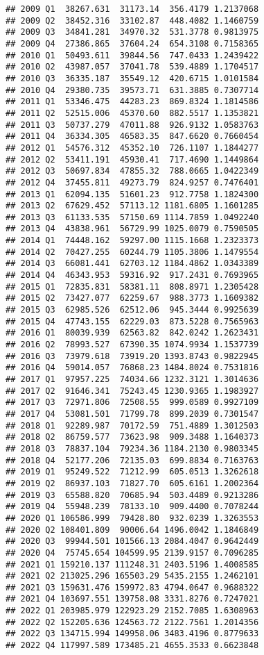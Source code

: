 \documentclass[
]{article}
\begin{document}
\begin{verbatim}
## 2009 Q1  38267.631  31173.14  356.4179 1.2137068
## 2009 Q2  38452.316  33102.87  448.4082 1.1460759
## 2009 Q3  34841.281  34970.32  531.3778 0.9813975
## 2009 Q4  27386.865  37604.24  654.3108 0.7158365
## 2010 Q1  50493.611  39844.56  747.0433 1.2439422
## 2010 Q2  43987.057  37041.78  539.4889 1.1704517
## 2010 Q3  36335.187  35549.12  420.6715 1.0101584
## 2010 Q4  29380.735  39573.71  631.3885 0.7307714
## 2011 Q1  53346.475  44283.23  869.8324 1.1814586
## 2011 Q2  52515.006  45370.60  882.5517 1.1353821
## 2011 Q3  50737.279  47011.88  926.9132 1.0583763
## 2011 Q4  36334.305  46583.35  847.6620 0.7660454
## 2012 Q1  54576.312  45352.10  726.1107 1.1844277
## 2012 Q2  53411.191  45930.41  717.4690 1.1449864
## 2012 Q3  50697.834  47855.32  788.0665 1.0422349
## 2012 Q4  37455.811  49273.79  824.9257 0.7476401
## 2013 Q1  62094.135  51601.23  912.7758 1.1824300
## 2013 Q2  67629.452  57113.12 1181.6805 1.1601285
## 2013 Q3  61133.535  57150.69 1114.7859 1.0492240
## 2013 Q4  43838.961  56729.99 1025.0079 0.7590505
## 2014 Q1  74448.162  59297.00 1115.1668 1.2323373
## 2014 Q2  70427.255  60244.79 1105.3806 1.1479554
## 2014 Q3  66081.441  62703.12 1184.4862 1.0343389
## 2014 Q4  46343.953  59316.92  917.2431 0.7693965
## 2015 Q1  72835.831  58381.11  808.8971 1.2305428
## 2015 Q2  73427.077  62259.67  988.3773 1.1609382
## 2015 Q3  62985.526  62512.06  945.3444 0.9925639
## 2015 Q4  47743.155  62229.03  873.5228 0.7565963
## 2016 Q1  80039.939  62563.82  842.0242 1.2623431
## 2016 Q2  78993.527  67390.35 1074.9934 1.1537739
## 2016 Q3  73979.618  73919.20 1393.8743 0.9822945
## 2016 Q4  59014.057  76868.23 1484.8024 0.7531816
## 2017 Q1  97957.225  74034.66 1232.3121 1.3014636
## 2017 Q2  91646.341  75243.45 1230.9365 1.1983927
## 2017 Q3  72971.806  72508.55  999.0589 0.9927109
## 2017 Q4  53081.501  71799.78  899.2039 0.7301547
## 2018 Q1  92289.987  70172.59  751.4889 1.3012503
## 2018 Q2  86759.577  73623.98  909.3488 1.1640373
## 2018 Q3  78837.104  79234.36 1184.2130 0.9803345
## 2018 Q4  52177.206  72135.03  699.8834 0.7163763
## 2019 Q1  95249.522  71212.99  605.0513 1.3262618
## 2019 Q2  86937.103  71827.70  605.6161 1.2002364
## 2019 Q3  65588.820  70685.94  503.4489 0.9213286
## 2019 Q4  55948.239  78133.10  909.4400 0.7078244
## 2020 Q1 106586.999  79428.80  932.0239 1.3263553
## 2020 Q2 108401.809  90006.64 1496.0042 1.1846849
## 2020 Q3  99944.501 101566.13 2084.4047 0.9642449
## 2020 Q4  75745.654 104599.95 2139.9157 0.7096285
## 2021 Q1 159210.137 111248.31 2403.5196 1.4008585
## 2021 Q2 213025.296 165503.29 5435.2155 1.2462101
## 2021 Q3 159631.476 159972.83 4794.0647 0.9688322
## 2021 Q4 103697.551 139758.08 3331.8276 0.7247021
## 2022 Q1 203985.979 122923.29 2152.7085 1.6308963
## 2022 Q2 152205.636 124563.72 2122.7561 1.2014356
## 2022 Q3 134715.994 149958.06 3483.4196 0.8779633
## 2022 Q4 117997.589 173485.21 4655.3533 0.6623848
\end{verbatim}
\end{document}
